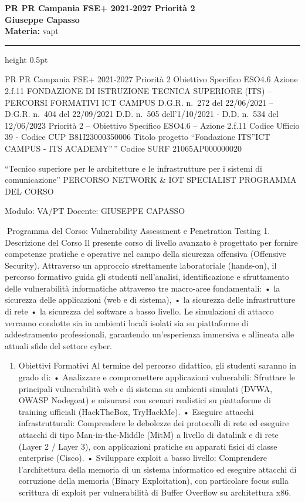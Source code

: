 \documentclass[11pt,a4paper]{article}
\providecommand{\tightlist}{%
  \setlength{\itemsep}{0pt}\setlength{\parskip}{0pt}}
\newcommand{\proposaltitle}[1]{
    \begin{center}
        \vspace*{0.1cm}
        {\LARGE \bfseries \color{blue} #1} \\[1.5ex]
        {\large \textbf{Giuseppe Capasso}} \\[1ex]
                \small{
            \vspace{0.1cm}
            \textbf{Materia:} vapt\\
        }
            \end{center}
    \vspace{0.3cm}
    \hrule height 0.5pt
    \vspace{0.5cm}
}
\begin{document}
\proposaltitle{PR PR Campania FSE+ 2021-2027 Priorità 2}

PR PR Campania FSE+ 2021-2027 Priorità 2 Obiettivo Specifico ESO4.6
Azione 2.f.11 FONDAZIONE DI ISTRUZIONE TECNICA SUPERIORE (ITS) --
PERCORSI FORMATIVI ICT CAMPUS D.G.R. n.~272 del 22/06/2021 -- D.G.R.
n.~404 del 22/09/2021 D.D. n.~505 dell'1/10/2021 - D.D. n.~534 del
12/06/2023 Priorità 2 -- Obiettivo Specifico ESO4.6 -- Azione 2.f.11
Codice Ufficio 39 - Codice CUP B81I23000350006 Titolo progetto
``Fondazione ITS''ICT CAMPUS - ITS ACADEMY''\,'' Codice SURF
21065AP000000020

``Tecnico superiore per le architetture e le infrastrutture per i
sistemi di comunicazione'' PERCORSO NETWORK \& IOT SPECIALIST PROGRAMMA
DEL CORSO

Modulo: VA/PT Docente: GIUSEPPE CAPASSO

Programma del Corso: Vulnerability Assessment e Penetration Testing 1.
Descrizione del Corso Il presente corso di livello avanzato è progettato
per fornire competenze pratiche e operative nel campo della sicurezza
offensiva (Offensive Security). Attraverso un approccio strettamente
laboratoriale (hands-on), il percorso formativo guida gli studenti
nell'analisi, identificazione e sfruttamento delle vulnerabilità
informatiche attraverso tre macro-aree fondamentali: • la sicurezza
delle applicazioni (web e di sistema), • la sicurezza delle
infrastrutture di rete • la sicurezza del software a basso livello. Le
simulazioni di attacco verranno condotte sia in ambienti locali isolati
sia su piattaforme di addestramento professionali, garantendo
un'esperienza immersiva e allineata alle attuali sfide del settore
cyber.

\begin{enumerate}
\def\labelenumi{\arabic{enumi}.}
\setcounter{enumi}{1}
\tightlist
\item
  Obiettivi Formativi Al termine del percorso didattico, gli studenti
  saranno in grado di: • Analizzare e compromettere applicazioni
  vulnerabili: Sfruttare le principali vulnerabilità web e di sistema su
  ambienti simulati (DVWA, OWASP Nodegoat) e misurarsi con scenari
  realistici su piattaforme di training ufficiali (HackTheBox,
  TryHackMe). • Eseguire attacchi infrastrutturali: Comprendere le
  debolezze dei protocolli di rete ed eseguire attacchi di tipo
  Man-in-the-Middle (MitM) a livello di datalink e di rete (Layer 2 /
  Layer 3), con applicazioni pratiche su apparati fisici di classe
  enterprise (Cisco). • Sviluppare exploit a basso livello: Comprendere
  l'architettura della memoria di un sistema informatico ed eseguire
  attacchi di corruzione della memoria (Binary Exploitation), con
  particolare focus sulla scrittura di exploit per vulnerabilità di
  Buffer Overflow su architettura x86.
\end{enumerate}
\end{document}
